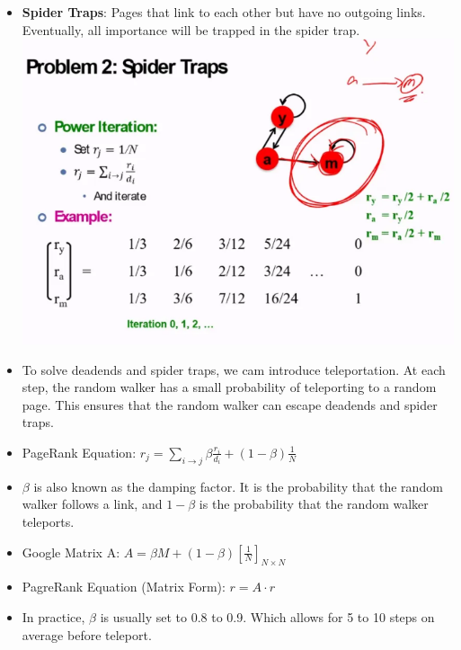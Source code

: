 \documentclass[10pt, landscape]{article}
\begin{document}
\begin{multicols*}{4}
\begin{itemize}
\begin{itemize}
        \item \textbf{Spider Traps}: Pages that link to each other but have no outgoing links. Eventually, all importance will be trapped in the spider trap. \includegraphics*[width=0.95\linewidth]{spider_trap.png}
        \item To solve deadends and spider traps, we cam introduce teleportation. At each step, the random walker has a small probability of teleporting to a random page. This ensures that the random walker can escape deadends and spider traps.
        \item PageRank Equation: $r_j = \underset{i \rightarrow j}{\sum} \beta \frac{r_i}{d_i} + (1 - \beta) \frac{1}{N}$
        \item $\beta$ is also known as the damping factor. It is the probability that the random walker follows a link, and $1 - \beta$ is the probability that the random walker teleports.
        \item Google Matrix A: $A  = \beta M + (1 - \beta) [\frac{1}{N}]_{N \times N} $
        \item PagreRank Equation (Matrix Form): $r = A \cdot r$
        \item In practice, $\beta$ is usually set to 0.8 to 0.9. Which allows for 5 to 10 steps on average before teleport.

\end{itemize}
\end{itemize}
\end{multicols*}
\end{document}
